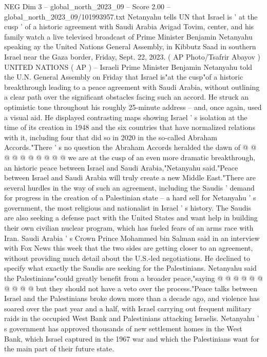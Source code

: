\begin{textsample}{NEG Dim 3 – global\_north\_2023\_09 – Score 2.00 – global\_north\_2023\_09/101993957.txt}  \label{ex:f3_neg_394}
Netanyahu tells UN that Israel is ' at the cusp ' of a historic agreement with Saudi Arabia Avigad Tovim, center, and his family watch a live televised broadcast of Prime Minister Benjamin Netanyahu speaking ay the United Nations General Assembly, in Kibbutz Saad in southern Israel near the Gaza border, Friday, Sept. 22, 2023. ( AP Photo/Tsafrir Abayov ) UNITED NATIONS ( AP ) -- Israeli Prime Minister Benjamin Netanyahu told the U.N.
General Assembly on Friday that Israel is"at the cusp"of a historic breakthrough leading to a peace agreement with Saudi Arabia, without outlining a clear path over the significant obstacles facing such an accord.
He struck an optimistic tone throughout his roughly 25-minute address -- and, once again, used a visual aid.
He displayed contrasting maps showing Israel ' s isolation at the time of its creation in 1948 and the six countries that have normalized relations with it, including four that did so in 2020 in the so-called Abraham Accords."There ' s no question the Abraham Accords heralded the dawn of @ @ @ @ @ @ @ @ @ @ we are at the cusp of an even more dramatic breakthrough, an historic peace between Israel and Saudi Arabia,"Netanyahu said."Peace between Israel and Saudi Arabia will truly create a new Middle East."There are several hurdles in the way of such an agreement, including the Saudis ' demand for progress in the creation of a Palestinian state -- a hard sell for Netanyahu ' s government, the most religious and nationalist in Israel ' s history.
The Saudis are also seeking a defense pact with the United States and want help in building their own civilian nuclear program, which has fueled fears of an arms race with Iran.
Saudi Arabia ' s Crown Prince Mohammed bin Salman said in an interview with Fox News this week that the two sides are getting closer to an agreement, without providing much detail about the U.S.-led negotiations.
He declined to specify what exactly the Saudis are seeking for the Palestinians.
Netanyahu said the Palestinians"could greatly benefit from a broader peace,"saying @ @ @ @ @ @ @ @ @ @ but they should not have a veto over the process."Peace talks between Israel and the Palestinians broke down more than a decade ago, and violence has soared over the past year and a half, with Israel carrying out frequent military raids in the occupied West Bank and Palestinians attacking Israelis.
Netanyahu ' s government has approved thousands of new settlement homes in the West Bank, which Israel captured in the 1967 war and which the Palestinians want for the main part of their future state.

\end{textsample}
